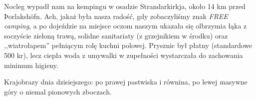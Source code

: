 
Nocleg wypadł nam na kempingu w osadzie Strandarkirkja, około 14 km przed Þorlakshöfn. Ach, jakaż była nasza radość, gdy zobaczyliśmy znak \emph{FREE camping}, a po dojeździe na miejsce oczom naszym ukazała się olbrzymia łąka z soczyście zieloną trawą, solidne sanitariaty (z grzejnikiem w środku) oraz ,,wiatrołapem'' pełniącym rolę kuchni polowej. Prysznic był płatny (standardowe 500 kr), lecz ciepła woda z umywalki w zupełności wystarczała do zachowania minimum higieny.

Krajobrazy dnia dzisiejszego: po prawej pastwiska i równina, po lewej masywne góry o niemal pionowych zboczach.

